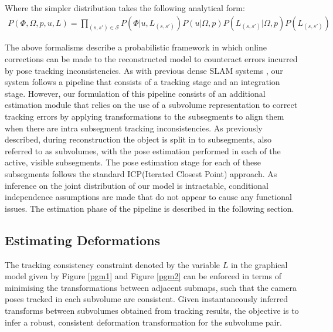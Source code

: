 Where the simpler distribution takes the following analytical form:
\begin{equation}
\begin{split}
P(\Phi, \Omega, p, u, L) = 
\prod_{(s, s') \in \mathcal{S}} P(\Phi|u, L_{(s, s')})
P(u|\Omega, p)
P(L_{(s, s')}|\Omega, p)
P(L_{(s, s')})
\end{split}
\end{equation}

The above formalisms describe a probabilistic framework in which online corrections can be made to the reconstructed model to counteract 
errors incurred by pose tracking inconsistencies. As with previous dense SLAM systems \cite{Newcombe2011, Prisacariu2014, Niessner2013}, 
our system follows a pipeline that consists of a tracking stage and an integration stage. However, our formulation of this pipeline 
consists of an additional estimation module that relies on the use of a subvolume representation to correct tracking errors by applying 
transformations to the subsegments to align them when there are intra subsegment tracking inconsistencies. 
As previously described, during reconstruction the object is split in to subsegments, also referred to as subvolumes, 
with the pose estimation performed in each of the active, visible subsegments. The pose estimation stage for each of these subsegments follows 
the standard ICP(Iterated Closest Point) approach.
As inference on the joint distribution of our model is intractable, conditional independence assumptions are made that do not appear 
to cause any functional issues. The estimation phase of the pipeline is described in the following section.

\subsection{Estimating Deformations}
The tracking consistency constraint denoted by the variable $L$ in the graphical model given by Figure \ref{pgm1} and Figure \ref{pgm2} can 
be enforced in terms of minimising the transformations between adjacent submaps, such that the camera poses tracked in each subvolume are consistent.  
Given instantaneously inferred transforms between subvolumes obtained from tracking results, 
the objective is to infer a robust, consistent deformation transformation for the subvolume pair.

